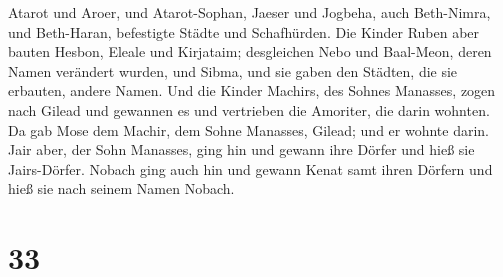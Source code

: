  Atarot und Aroer, und Atarot-Sophan, Jaeser und Jogbeha,
 auch Beth-Nimra, und Beth-Haran, befestigte Städte und
Schafhürden.  Die Kinder Ruben aber bauten Hesbon,
 Eleale und Kirjataim; desgleichen Nebo und Baal-Meon,
deren Namen verändert wurden, und Sibma, und sie gaben den Städten, die
sie erbauten, andere Namen.  Und die Kinder Machirs, des
Sohnes Manasses, zogen nach Gilead und gewannen es und vertrieben die
Amoriter, die darin wohnten.  Da gab Mose dem Machir, dem
Sohne Manasses, Gilead; und er wohnte darin.  Jair aber,
der Sohn Manasses, ging hin und gewann ihre Dörfer und hieß sie
Jairs-Dörfer.  Nobach ging auch hin und gewann Kenat samt
ihren Dörfern und hieß sie nach seinem Namen Nobach.

\hypertarget{section-32}{%
\section{33}\label{section-32}}

